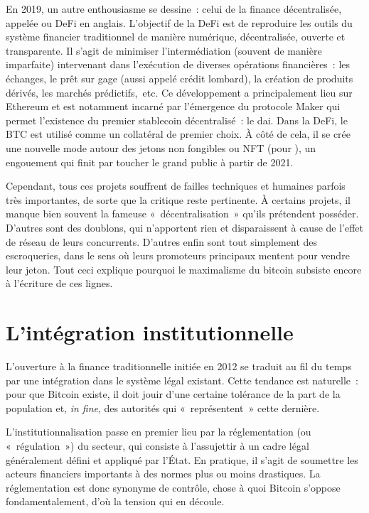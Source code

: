 
En 2019, un autre enthousiasme se dessine~: celui de la finance décentralisée, appelée  ou DeFi en anglais. L'objectif de la DeFi est de reproduire les outils du système financier traditionnel de manière numérique, décentralisée, ouverte et transparente. Il s'agit de minimiser l'intermédiation (souvent de manière imparfaite) intervenant dans l'exécution de diverses opérations financières~: les échanges, le prêt sur gage (aussi appelé crédit lombard), la création de produits dérivés, les marchés prédictifs,~etc. Ce développement a principalement lieu sur Ethereum et est notamment incarné par l'émergence du protocole Maker qui permet l'existence du premier stablecoin décentralisé~: le dai. Dans la DeFi, le BTC est utilisé comme un collatéral de premier choix. À côté de cela, il se crée une nouvelle mode autour des jetons non fongibles ou NFT (pour ), un engouement qui finit par toucher le grand public à partir de 2021.

Cependant, tous ces projets souffrent de failles techniques et humaines parfois très importantes, de sorte que la critique reste pertinente. À certains projets, il manque bien souvent la fameuse «~décentralisation~» qu'ils prétendent posséder. D'autres sont des doublons, qui n'apportent rien et disparaissent à cause de l'effet de réseau de leurs concurrents. D'autres enfin sont tout simplement des escroqueries, dans le sens où leurs promoteurs principaux mentent pour vendre leur jeton. Tout ceci explique pourquoi le maximalisme du bitcoin subsiste encore à l'écriture de ces lignes.

\section*{L'intégration institutionnelle} %

L'ouverture à la finance traditionnelle initiée en 2012 se traduit au fil du temps par une intégration dans le système légal existant. Cette tendance est naturelle~: pour que Bitcoin existe, il doit jouir d'une certaine tolérance de la part de la population et, \emph{in fine}, des autorités qui «~représentent~» cette dernière.

L'institutionnalisation passe en premier lieu par la réglementation (ou «~régulation~») du secteur, qui consiste à l'assujettir à un cadre légal généralement défini et appliqué par l'État. En pratique, il s'agit de soumettre les acteurs financiers importants à des normes plus ou moins drastiques. La réglementation est donc synonyme de contrôle, chose à quoi Bitcoin s'oppose fondamentalement, d'où la tension qui en découle.

